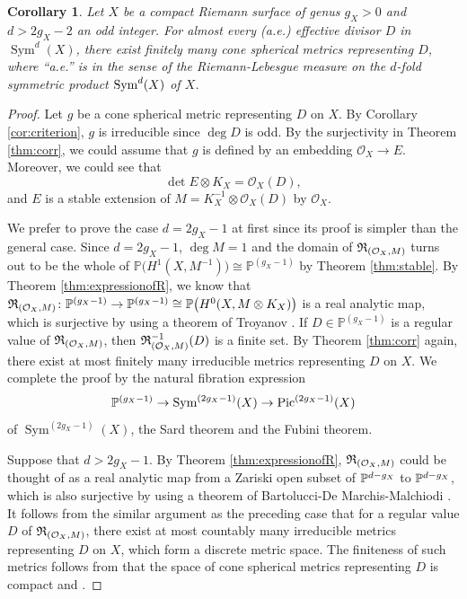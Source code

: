 \documentclass[12pt]{article}
\newtheorem{cor}{Corollary}[section]
\begin{document}
\begin{cor}
\label{cor:finitemetric}
Let $X$ be a compact Riemann surface of genus $g_X>0$ and $d > 2g_X-2$ an odd integer.
For almost every (a.e.) effective divisor $D$ in $\operatorname{Sym}^{d}(X)$,
 there exist finitely many cone spherical metrics representing $D$, where ``a.e.'' is in the sense of the Riemann-Lebesgue measure on the $d$-fold symmetric product ${\rm Sym}^{d}(X)$ of $X$.
\end{cor}
\begin{proof}
Let $g$ be a cone spherical metric representing $D$ on $X$. By Corollary \ref{cor:criterion}, $g$ is irreducible since $\deg D$ is odd. By the surjectivity in Theorem \ref{thm:corr}, we could assume that $g$ is defined by an embedding $\mathcal{O}_{X} \to E$. Moreover, we could see that
\[ \det E \otimes K_{X} = \mathcal{O}_{X}(D), \]
and $E$ is a stable extension of $M = K_{X}^{-1} \otimes \mathcal{O}_{X}(D)$ by $\mathcal{O}_{X}$.

We prefer to prove the case $d=2g_X-1$ at first since its proof is simpler than the general case.
Since $d=2g_X-1$,  $\deg M = 1$ and the domain of ${\frak R}_{(\mathcal{O}_{X}, M)}$ turns out to be the whole of $\mathbb{P}\Big(H^{1}(X, M^{-1})\Big) \cong \mathbb{P}^{(g_{X} - 1)}$ by Theorem \ref{thm:stable}. By Theorem \ref{thm:expressionofR}, we know that ${\frak R}_{(\mathcal{O}_{X}, M)} \colon \mathbb{P}^{(g_{X} - 1)} \to \mathbb{P}^{(g_{X} - 1)} \cong \mathbb{P}\big(H^{0}(X, M \otimes K_{X}) \big)$ is a real analytic map, which is surjective by using a theorem of Troyanov \cite[Theorem C]{Troyanov91}. If $D \in \mathbb{P}^{(g_{X} - 1)}$ is a regular value of ${\frak R}_{(\mathcal{O}_{X}, M)}$, then ${\frak R}_{(\mathcal{O}_{X}, M)}^{-1}(D)$ is a finite set. By Theorem \ref{thm:corr} again, there exist at most finitely many irreducible  metrics representing $D$ on $X$. We complete the proof by the natural fibration expression
\[{\Bbb P}^{(g_X-1)}\to \operatorname{Sym}^{(2g_{X} - 1)}(X)\to {\rm Pic}^{(2g_X-1)}(X)\]
of $\operatorname{Sym}^{(2g_{X} - 1)}(X)$, the Sard theorem and the Fubini theorem.

Suppose that $d > 2g_X - 1$. By Theorem \ref{thm:expressionofR},  ${\frak R}_{(\mathcal{O}_{X}, M)}$ could be thought of as a real analytic map from a Zariski open subset of ${\Bbb P}^{d-g_X}$ to ${\Bbb P}^{d-g_X}$, which is also surjective by using a theorem of Bartolucci-De Marchis-Malchiodi \cite[Theorem 1.1]{BdMM11}. It follows from the similar argument as the preceding case that for a regular value $D$ of ${\frak R}_{(\mathcal{O}_{X}, M)}$, there exist at most countably many irreducible metrics representing $D$ on $X$, which form a discrete metric space. The finiteness of such metrics follows from that
 the space of cone spherical metrics representing $D$ is compact \cite[Theorem, p.6]{BT02} and \cite[Theorem 1.16]{MP1807}.
\end{proof}
\end{document}
